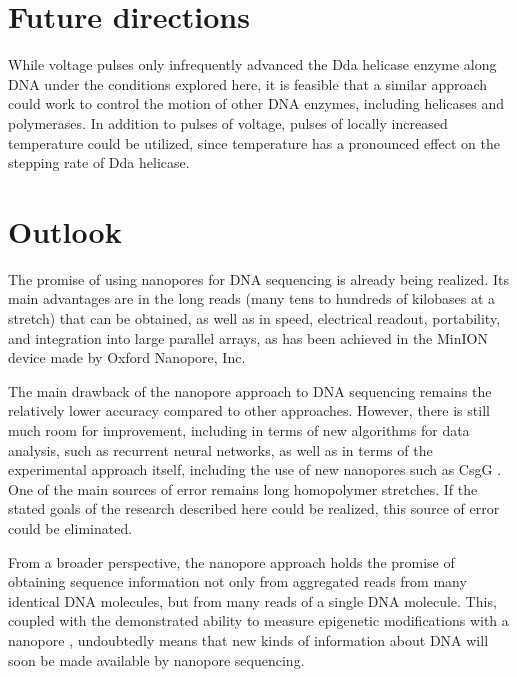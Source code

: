\section{Future directions}

While voltage pulses only infrequently advanced the Dda helicase enzyme along DNA under the conditions explored here, it is feasible that a similar approach could work to control the motion of other DNA enzymes, including helicases and polymerases.  In addition to pulses of voltage, pulses of locally increased temperature could be utilized, since temperature has a pronounced effect on the stepping rate of Dda helicase.

\section{Outlook}

The promise of using nanopores for DNA sequencing is already being realized.  Its main advantages are in the long reads (many tens to hundreds of kilobases at a stretch) that can be obtained, as well as in speed, electrical readout, portability, and integration into large parallel arrays, as has been achieved in the MinION device made by Oxford Nanopore, Inc.

The main drawback of the nanopore approach to DNA sequencing remains the relatively lower accuracy compared to other approaches.  However, there is still much room for improvement, including in terms of new algorithms for data analysis, such as recurrent neural networks, as well as in terms of the experimental approach itself, including the use of new nanopores such as CsgG \citep{Goyal2014, Deamer2016}.  One of the main sources of error remains long homopolymer stretches.  If the stated goals of the research described here could be realized, this source of error could be eliminated.

From a broader perspective, the nanopore approach holds the promise of obtaining sequence information not only from aggregated reads from many identical DNA molecules, but from many reads of a single DNA molecule.  This, coupled with the demonstrated ability to measure epigenetic modifications with a nanopore \citep{Schreiber2013, Laszlo2013, Wescoe2014, Simpson2017}, undoubtedly means that new kinds of information about DNA will soon be made available by nanopore sequencing.
